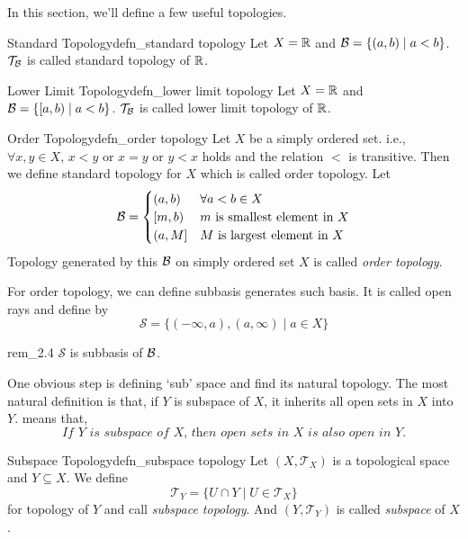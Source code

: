 \documentclass[12pt, a4paper, twoside]{article}
\newcommand{\CS}{{\mathcal {S}}} \newcommand{\CT}{{\mathcal {T}}}
\theoremstyle{plain}
\begin{document}
In this section, we'll define a few useful topologies. 

\begin{defn}{Standard Topology}{defn_standard topology}
    Let $X = {\mathbb {R}}$ and ${\mathcal {B}} = \{(a, b) \mid a < b\}$. $\CT_\CB$ is called standard topology of ${\mathbb {R}}$. 
\end{defn}

\begin{defn}{Lower Limit Topology}{defn_lower limit topology}
    Let $X = {\mathbb {R}}$ and ${\mathcal {B}} = \{[a, b) \mid a < b\}$. $\CT_\CB$ is called lower limit topology of ${\mathbb {R}}$. 
\end{defn}

\begin{defn}{Order Topology}{defn_order topology}
    Let $X$ be a simply ordered set. i.e., $\forall x, y \in X$, $x < y$ or $x = y$ or $y < x$ holds and the relation $<$ is transitive.
    Then we define standard topology for $X$ which is called order topology. Let 
    \[{\mathcal {B}} = \begin{cases}
        (a, b) & \forall a < b \in X \\
        [m, b) & m \text{ is smallest element in }X \\
        (a, M] & M \text{ is largest element in }X 
    \end{cases}\]
    Topology generated by this ${\mathcal {B}}$ on simply ordered set $X$ is called \textit{order topology}. 
\end{defn}

For order topology, we can define subbasis generates such basis. It is called open rays and define by 
\[\CS = \{(-\infty, a), (a, \infty) \mid a \in X\}\]
\begin{rem}{}{rem_2.4}
    $\CS$ is subbasis of ${\mathcal {B}}$. 
\end{rem}

One obvious step is defining \lq sub' space and find its natural topology. The most natural 
definition is that, if $Y$ is subspace of $X$, it inherits all open sets in $X$ into $Y$. means that, 
\[\textit{If $Y$ is subspace of $X$, then open sets in $X$ is also open in $Y$.}\]

\vspace{1mm}

\begin{defn}{Subspace Topology}{defn_subspace topology}
    Let $(X, \CT_X)$ is a topological space and $Y \subseteq X$. We define 
    \[\CT_Y = \{U \cap Y \mid U \in \CT_X\}\]
    for topology of $Y$ and call \textit{subspace topology}. And $(Y, \CT_Y)$ is called \textit{subspace} of $X$. 
\end{defn}
\end{document}
